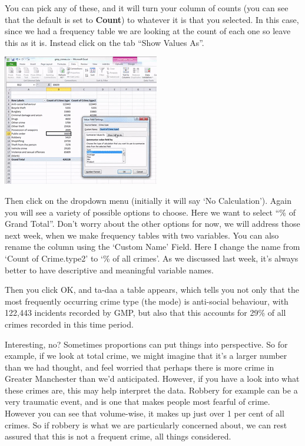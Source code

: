 \documentclass[]{book}
\theoremstyle{definition}
\theoremstyle{definition}
\theoremstyle{definition}
\theoremstyle{remark}
\begin{document}
You can pick any of these, and it will turn your column of counts (you
can see that the default is set to \textbf{Count}) to whatever it is
that you selected. In this case, since we had a frequency table we are
looking at the count of each one so leave this as it is. Instead click
on the tab ``Show Values As''.

\includegraphics{imgs/perc_menu.gif}

Then click on the dropdown menu (initially it will say `No
Calculation'). Again you will see a variety of possible options to
choose. Here we want to select ``\% of Grand Total''. Don't worry about
the other options for now, we will address those next week, when we make
frequency tables with two variables. You can also rename the column
using the `Custom Name' Field. Here I change the name from `Count of
Crime.type2' to `\% of all crimes'. As we discussed last week, it's
always better to have descriptive and meaningful variable names.

Then you click OK, and ta-daa a table appears, which tells you not only
that the most frequently occurring crime type (the mode) is anti-social
behaviour, with 122,443 incidents recorded by GMP, but also that this
accounts for 29\% of all crimes recorded in this time period.

Interesting, no? Sometimes proportions can put things into perspective.
So for example, if we look at total crime, we might imagine that it's a
larger number than we had thought, and feel worried that perhaps there
is more crime in Greater Manchester than we'd anticipated. However, if
you have a look into what these crimes are, this may help interpret the
data. Robbery for example can be a very traumatic event, and is one that
makes people most fearful of crime. However you can see that
volume-wise, it makes up just over 1 per cent of all crimes. So if
robbery is what we are particularly concerned about, we can rest assured
that this is not a frequent crime, all things considered.
\end{document}

